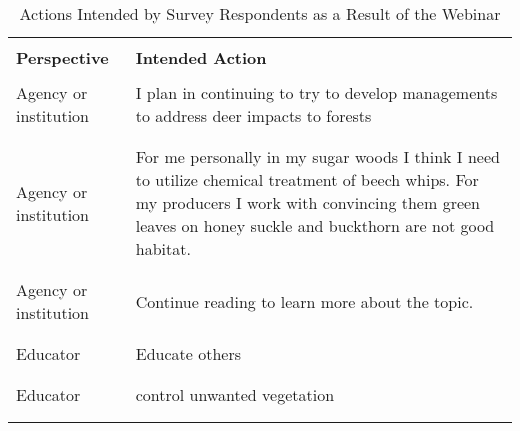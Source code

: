 \documentclass[
]{article}
\begin{document}
\begin{longtable}[t]{l>{\raggedright\arraybackslash}p{10cm}}
\caption{\label{tab:unnamed-chunk-13}Actions Intended by Survey Respondents as a Result of the Webinar}\\
\toprule
\multicolumn{2}{c}{ } \\

\begingroup\fontsize{14}{16}\selectfont \textbf{Perspective}\endgroup & \begingroup\fontsize{14}{16}\selectfont \textbf{Intended Action}\endgroup\\
\midrule
\cellcolor{gray!10}{Agency or institution} & \cellcolor{gray!10}{I will share this information with my Agency's Private Lands Management Biologists.}\\
\midrule
Agency or institution & I plan in continuing to try to develop managements to address deer impacts to forests\\
\midrule\\
\cellcolor{gray!10}{Agency or institution} & \cellcolor{gray!10}{Try to educate participants better on invasive management}\\
\midrule
Agency or institution & For me personally in my sugar woods I think I need to utilize chemical treatment of beech whips. For my producers I work with convincing them green leaves on honey suckle and buckthorn are not good habitat.\\
\midrule\\
\cellcolor{gray!10}{Agency or institution} & \cellcolor{gray!10}{Identifying forested areas that have the most prevalence of interfering vegetation.}\\
\midrule
\addlinespace
Agency or institution & Continue reading to learn more about the topic.\\
\midrule\\
\cellcolor{gray!10}{Educator} & \cellcolor{gray!10}{comment to NHFG  --- too slow to educate broader public and alter rules too slowly - survey shows little public awareness.}\\
\midrule
Educator & Educate others\\
\midrule\\
\cellcolor{gray!10}{Educator} & \cellcolor{gray!10}{Increase biodiversity.}\\
\midrule
Educator & control unwanted vegetation\\
\midrule\\
\addlinespace
\cellcolor{gray!10}{Educator} & \cellcolor{gray!10}{Place the links to the four referenced documents on a page I can distribute at SOT Chapter meetings and at MFO visits.}\\

\end{longtable}
\end{document}

